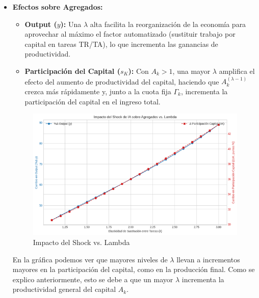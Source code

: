 \documentclass{article}
\theoremstyle{remark}
\theoremstyle{definition}
\begin{document}
\begin{enumerate}
\begin{tcolorbox}[title= Soluci\'on 5]
\begin{itemize}
\begin{itemize}
      \item \textbf{Efectos sobre Agregados:}
        \begin{itemize}
          \item \textbf{Output (\(y\)):} Una \(\lambda\) alta facilita la reorganización de la economía para aprovechar al máximo el factor automatizado (sustituir trabajo por capital en tareas TR/TA), lo que incrementa las ganancias de productividad.
          \item \textbf{Participación del Capital (\(s_K\)):} Con \(A_k > 1\), una mayor \(\lambda\) amplifica el efecto del aumento de productividad del capital, haciendo que \(A_k^{(\lambda-1)}\) crezca más rápidamente y, junto a la cuota fija \(\Gamma_k\), incrementa la participación del capital en el ingreso total.
        \end{itemize}
            \begin{figure}[H] 
                \centering
                \includegraphics[width=0.7\linewidth]{views/entrega2/62.png}
                \caption{Impacto del Shock vs. Lambda}
                \label{fig:graflamb}
            \end{figure}
            En la gr\'afica podemos ver que mayores niveles de $\lambda$ llevan a incrementos mayores en la participaci\'on del capital, como en la producci\'on final. Como se explico anteriormente, esto se debe a que un mayor $\lambda$ incrementa la productividad general del capital $A_k$.
    \end{itemize}
    

\end{itemize}
\end{tcolorbox}
\end{enumerate}
\end{document}
